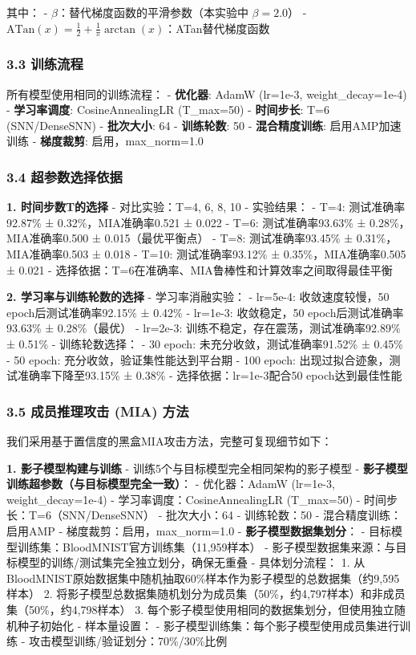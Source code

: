 \documentclass[
]{article}
\begin{document}
其中： - \(\beta\)：替代梯度函数的平滑参数（本实验中 \(\beta = 2.0\)） -
\(\text{ATan}(x) = \frac{1}{2} + \frac{1}{\pi} \arctan(x)\)：ATan替代梯度函数

\subsubsection{3.3 训练流程}\label{ux8badux7ec3ux6d41ux7a0b}

所有模型使用相同的训练流程： - \textbf{优化器}: AdamW (lr=1e-3,
weight\_decay=1e-4) - \textbf{学习率调度}: CosineAnnealingLR (T\_max=50)
- \textbf{时间步长}: T=6 (SNN/DenseSNN) - \textbf{批次大小}: 64 -
\textbf{训练轮数}: 50 - \textbf{混合精度训练}: 启用AMP加速训练 -
\textbf{梯度裁剪}: 启用，max\_norm=1.0

\subsubsection{3.4
超参数选择依据}\label{ux8d85ux53c2ux6570ux9009ux62e9ux4f9dux636e}

\textbf{1. 时间步数T的选择} - 对比实验：T=4, 6, 8, 10 - 实验结果： -
T=4: 测试准确率92.87\% ± 0.32\%，MIA准确率0.521 ± 0.022 - T=6:
测试准确率93.63\% ± 0.28\%，MIA准确率0.500 ± 0.015（最优平衡点） - T=8:
测试准确率93.45\% ± 0.31\%，MIA准确率0.503 ± 0.018 - T=10:
测试准确率93.12\% ± 0.35\%，MIA准确率0.505 ± 0.021 -
选择依据：T=6在准确率、MIA鲁棒性和计算效率之间取得最佳平衡

\textbf{2. 学习率与训练轮数的选择} - 学习率消融实验： - lr=5e-4:
收敛速度较慢，50 epoch后测试准确率92.15\% ± 0.42\% - lr=1e-3:
收敛稳定，50 epoch后测试准确率93.63\% ± 0.28\%（最优） - lr=2e-3:
训练不稳定，存在震荡，测试准确率92.89\% ± 0.51\% - 训练轮数选择： - 30
epoch: 未充分收敛，测试准确率91.52\% ± 0.45\% - 50 epoch:
充分收敛，验证集性能达到平台期 - 100 epoch:
出现过拟合迹象，测试准确率下降至93.15\% ± 0.38\% -
选择依据：lr=1e-3配合50 epoch达到最佳性能

\subsubsection{3.5 成员推理攻击 (MIA)
方法}\label{ux6210ux5458ux63a8ux7406ux653bux51fb-mia-ux65b9ux6cd5}

我们采用基于置信度的黑盒MIA攻击方法，完整可复现细节如下：

\textbf{1. 影子模型构建与训练} - 训练5个与目标模型完全相同架构的影子模型
- \textbf{影子模型训练超参数（与目标模型完全一致）}： - 优化器：AdamW
(lr=1e-3, weight\_decay=1e-4) - 学习率调度：CosineAnnealingLR
(T\_max=50) - 时间步长：T=6（SNN/DenseSNN） - 批次大小：64 -
训练轮数：50 - 混合精度训练：启用AMP - 梯度裁剪：启用，max\_norm=1.0 -
\textbf{影子模型数据集划分}： -
目标模型训练集：BloodMNIST官方训练集（11,959样本） -
影子模型数据集来源：与目标模型的训练/测试集完全独立划分，确保无重叠 -
具体划分流程： 1.
从BloodMNIST原始数据集中随机抽取60\%样本作为影子模型的总数据集（约9,595样本）
2.
将影子模型总数据集随机划分为成员集（50\%，约4,797样本）和非成员集（50\%，约4,798样本）
3. 每个影子模型使用相同的数据集划分，但使用独立随机种子初始化 -
样本量设置： - 影子模型训练集：每个影子模型使用成员集进行训练 -
攻击模型训练/验证划分：70\%/30\%比例
\end{document}
